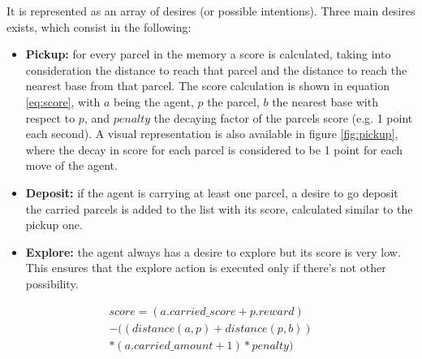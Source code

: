 It is represented as an array of desires (or possible intentions).
Three main desires exists, which consist in the following:
\begin{itemize}
    \item \textbf{Pickup:} for every parcel in the memory a score is calculated, taking into consideration the distance to reach that parcel and the distance to reach the nearest base from that parcel.
    The score calculation is shown in equation \ref{eq:score}, with $a$ being the agent, $p$ the parcel, $b$ the nearest base with respect to $p$, and $penalty$ the decaying factor of the parcels score (e.g. 1 point each second).
    A visual representation is also available in figure \ref{fig:pickup}, where the decay in score for each parcel is considered to be 1 point for each move of the agent. 
    
    \item \textbf{Deposit:} if the agent is carrying at least one parcel, a desire to go deposit the carried parcels is added to the list with its score, calculated similar to the pickup one.
    
    \item \textbf{Explore:} the agent always has a desire to explore but its score is very low. This ensures that the explore action is executed only if there's not other possibility.
\end{itemize}

\begin{equation}    \label{eq:score}
\begin{split}    
    score = (a.carried\_score + p.reward) \\ - ((distance(a, p) + distance(p, b)) \\ * (a.carried\_amount + 1) * penalty)
\end{split}
\end{equation}


